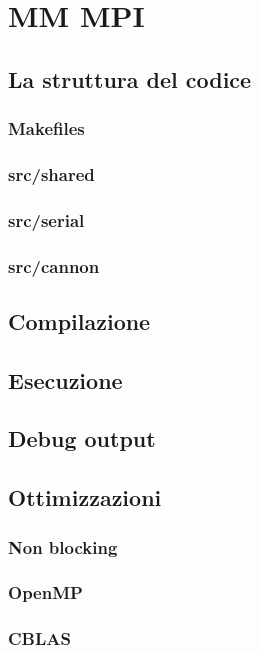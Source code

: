 \chapter{MM MPI}
\section{La struttura del codice}
\subsection{Makefiles}
\subsection{src/shared}
\subsection{src/serial}
\subsection{src/cannon}

\section{Compilazione}
\section{Esecuzione}
\section{Debug output}
\section{Ottimizzazioni}
\subsection{Non blocking}
\subsection{OpenMP}
\subsection{CBLAS}

